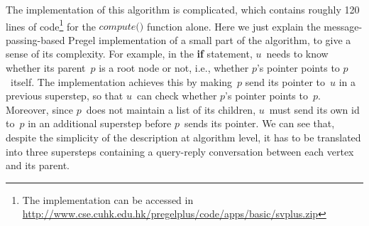 \documentclass{sokendai_thesis} %
\begin{document}

The implementation of this algorithm is complicated, which contains roughly 120 lines of code\footnote{The implementation can be accessed in \url{http://www.cse.cuhk.edu.hk/pregelplus/code/apps/basic/svplus.zip}} for the $\textit{compute()}$ function alone.
Here we just explain the message-passing-based Pregel implementation of a small part of the algorithm, to give a sense of its complexity.
For example, in the \textbf{if} statement, $u$~needs to know whether its parent~$p$ is a root node or not, i.e., whether $p$'s pointer points to $p$~itself.
The implementation achieves this by making~$p$ send its pointer to~$u$ in a previous superstep, so that $u$~can check whether $p$'s pointer points to~$p$.
Moreover, since $p$~does not maintain a list of its children, $u$~must send its own id to~$p$ in an additional superstep before $p$~sends its pointer.
We can see that, despite the simplicity of the description at algorithm level, it has to be translated into three supersteps containing a query-reply conversation between each vertex and its parent.
\end{document}
